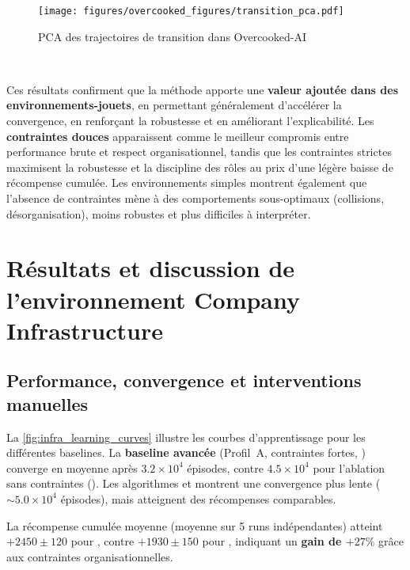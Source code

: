 \begin{figure}[h!]
  \centering
  \texttt{[image: figures/overcooked\_figures/transition\_pca.pdf]}
  \caption{PCA des trajectoires de transition dans Overcooked-AI}
  \label{fig:overcooked_pca}
\end{figure}

\

Ces résultats confirment que la méthode  apporte une \textbf{valeur ajoutée dans des environnements-jouets}, en permettant généralement d'accélérer la convergence, en renforçant la robustesse et en améliorant l'explicabilité.
Les \textbf{contraintes douces} apparaissent comme le meilleur compromis entre performance brute et respect organisationnel, tandis que les contraintes strictes maximisent la robustesse et la discipline des rôles au prix d'une légère baisse de récompense cumulée.
Les environnements simples montrent également que l'absence de contraintes mène à des comportements sous-optimaux (collisions, désorganisation), moins robustes et plus difficiles à interpréter.

\section{Résultats et discussion de l'environnement Company Infrastructure}\label{sec:results_and_discussion_infra}

\subsection*{Performance, convergence et interventions manuelles}

La \autoref{fig:infra_learning_curves} illustre les courbes d'apprentissage pour les différentes baselines.
La \textbf{baseline avancée} (Profil~A, contraintes fortes, ) converge en moyenne après $3.2 \times 10^4$ épisodes, contre $4.5 \times 10^4$ pour l'ablation sans contraintes ().
Les algorithmes  et  montrent une convergence plus lente ($\sim 5.0 \times 10^4$ épisodes), mais atteignent des récompenses comparables.

La récompense cumulée moyenne (moyenne sur 5 runs indépendantes) atteint $+2450 \pm 120$ pour , contre $+1930 \pm 150$ pour , indiquant un \textbf{gain de $+27\%$} grâce aux contraintes organisationnelles.

